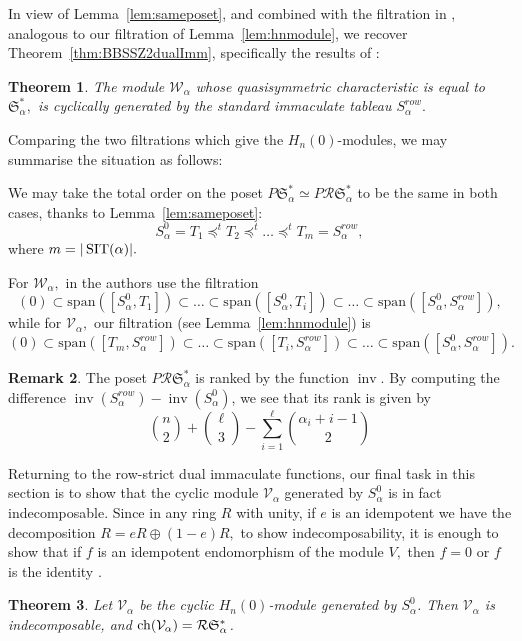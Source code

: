 \documentclass[12pt,letterpaper]{amsart}
\newtheorem{theorem}{Theorem}[section]
\theoremstyle{definition}
\newtheorem{remark}[theorem]{Remark}
\newcommand{\dI}{\mathfrak{S}^*}
\newcommand{\rdI}{\mathcal{R}\mathfrak{S}^*}
\DeclareMathOperator{\inv}{inv}
\newcommand{\hn}{H_n(0)}
\begin{document}
In view of Lemma~\ref{lem:sameposet}, and combined with the filtration in \cite{BBSSZ2015}, analogous to our filtration of Lemma~\ref{lem:hnmodule}, we recover Theorem~\ref{thm:BBSSZ2dualImm}, specifically the results of \cite[Theorem 3.5, Lemma 3.10]{BBSSZ2015}:

\begin{theorem}\label{thm:BBSSZ2-cyclic}\cite[Lemma 3.10]{BBSSZ2015} The module $\mathcal{W}_\alpha$ whose  quasisymmetric characteristic is equal to $\dI_\alpha,$ is cyclically  generated by the standard immaculate tableau $ S^{row}_\alpha.$
\end{theorem}

Comparing the two filtrations which give the $\hn$-modules, we may summarise the situation as follows:

We may take the  total order on the poset $P\dI_\alpha\simeq P\rdI_\alpha$ to be  the same in both cases, thanks to Lemma~\ref{lem:sameposet}:
\[S^0_\alpha= T_1\preccurlyeq^t T_2 \preccurlyeq^t\dots \preccurlyeq^t T_m=S^{row}_\alpha,\]
where $m=|\operatorname{SIT}(\alpha)|.$

For $\mathcal{W}_\alpha,$ in \cite{BBSSZ2015} the authors use 
the filtration  
\[(0)\subset \mathrm{span}([S^0_\alpha, T_1])
\subset \dots \subset 
\mathrm{span}([S^0_\alpha, T_i])\subset \dots \subset \mathrm{span}([S^0_\alpha, S^{row}_\alpha]),\]
while for $\mathcal{V}_\alpha,$
our filtration (see Lemma~\ref{lem:hnmodule}) is
\[ (0)\subset\mathrm{span}([T_m,S^{row}_\alpha]) 
\subset\dots\subset \mathrm{span}([T_i,S^{row}_\alpha])\subset \dots \subset 
\mathrm{span}([S^0_\alpha, S^{row}_\alpha]).\]
\begin{remark}\label{rem:poset-rank}
The poset $P\rdI_\alpha$ is ranked by the function $\inv$. By computing the difference $\inv(S^{row}_\alpha)-\inv(S^0_\alpha)$, we see that 
its rank is given by 
\[\binom{n}{2}+\binom{\ell}{3}-\sum_{i=1}^{\ell} \binom{\alpha_{i}+i-1}{2}\]
\end{remark}
Returning to the row-strict dual immaculate functions, our final task in this section is to show that 
the cyclic module $\mathcal{V}_\alpha$ generated by $S^0_\alpha$ is in fact indecomposable.
Since in any ring $R$ with unity, if $e$ is an idempotent we have 
the decomposition $R=eR\oplus (1-e)R,$ to show indecomposability, it is enough to show that if $f$ is an idempotent endomorphism of the module $V,$ then $f=0$ or $f$ is  the identity \cite[Proposition 3.1]{Jacobson1989}.

\begin{theorem}\label{thm:Indecomp} Let $\mathcal{V}_\alpha$ be the cyclic $\hn$-module generated by $S^0_\alpha$. Then $\mathcal{V}_\alpha$ is indecomposable, and $\chr(\mathcal{V}_\alpha)=\rdI_\alpha$.
\end{theorem}
\end{document}
